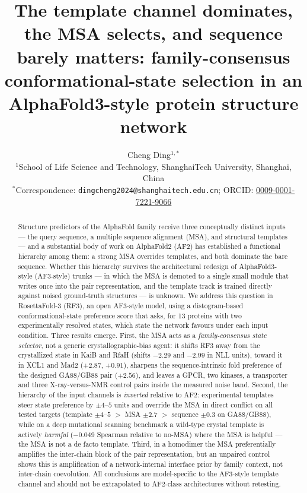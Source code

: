 \documentclass[11pt]{article}
\title{The template channel dominates, the MSA selects, and sequence barely
matters: family-consensus conformational-state selection in an
AlphaFold3-style protein structure network}
\author{Cheng Ding$^{1,\ast}$\\
\small $^{1}$School of Life Science and Technology, ShanghaiTech University, Shanghai, China\\
\small $^{\ast}$Correspondence: \texttt{dingcheng2024@shanghaitech.edu.cn}; ORCID: \href{https://orcid.org/0009-0001-7221-9066}{0009-0001-7221-9066}}
\date{}
\begin{document}
\maketitle

\begin{abstract}
\noindent
Structure predictors of the AlphaFold family receive three conceptually
distinct inputs --- the query sequence, a multiple sequence alignment (MSA),
and structural templates --- and a substantial body of work on AlphaFold2
(AF2) has established a functional hierarchy among them: a strong MSA
overrides templates, and both dominate the bare sequence. Whether this
hierarchy survives the architectural redesign of AlphaFold3-style (AF3-style)
trunks --- in which the MSA is demoted to a single small module that writes
once into the pair representation, and the template track is trained directly
against noised ground-truth structures --- is unknown. We address this
question in RosettaFold-3 (RF3), an open AF3-style model, using a
distogram-based conformational-state preference score that asks, for 13
proteins with two experimentally resolved states, which state the network
favours under each input condition. Three results emerge. First, the MSA
acts as a \emph{family-consensus state selector}, not a generic
crystallographic-bias agent: it shifts RF3 away from the crystallized state
in KaiB and RfaH (shifts $-2.29$ and $-2.99$ in NLL units), toward it in
XCL1 and Mad2 ($+2.87$, $+0.91$), sharpens the sequence-intrinsic fold
preference of the designed GA88/GB88 pair ($+2.56$), and leaves a GPCR, two
kinases, a transporter and three X-ray-versus-NMR control pairs inside the
measured noise band. Second, the hierarchy of the input channels is
\emph{inverted} relative to AF2: experimental templates steer state
preference by $\pm 4$--$5$ units and override the MSA in direct conflict
on all tested targets (template $\pm 4$--$5$ $>$ MSA $\pm 2.7$ $>$
sequence $\pm 0.3$ on GA88/GB88), while on a deep mutational scanning
benchmark a wild-type crystal template is actively \emph{harmful}
($-0.049$ Spearman relative to no-MSA) where the MSA is helpful --- the
MSA is not a de facto template. Third, in a homodimer the MSA preferentially
amplifies the inter-chain block of the pair representation, but an unpaired
control shows this is amplification of a network-internal interface prior by
family context, not inter-chain coevolution. All conclusions are
model-specific to the AF3-style template channel and should not be
extrapolated to AF2-class architectures without retesting.
\end{abstract}
\end{document}
